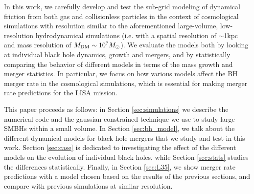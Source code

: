 In this work, we carefully develop and test the sub-grid modeling of dynamical friction from both gas and collisionless particles in the context of cosmological simulations with resolution similar to the aforementioned large-volume, low-resolution hydrodynamical simulations (i.e. with a spatial resolution of $\sim$1kpc and mass resolution of $M_{\rm DM}\sim 10^7M_\odot$). We evaluate the models both by looking at individual black hole dynamics, growth and mergers, and by statistically comparing the behavior of different models in terms of the mass growth and merger statistics. In particular, we focus on how various models affect the BH merger rate in the cosmological simulations, which is essential for making merger rate predictions for the LISA mission.
    
This paper proceeds as follows: in Section \ref{sec:simulations} we describe the numerical code and the gaussian-constrained technique we use to study large SMBHs within a small volume. In Section \ref{sec:bh_model}, we talk about the different dynamical models for black hole mergers that we study and test in this work. Section \ref{sec:case} is dedicated to investigating the effect of the different models on the evolution of individual black holes, while Section \ref{sec:stats} studies the differences statistically. Finally, in Section \ref{sec:L35}, we show merger rate predictions with a model chosen based on the results of the previous sections, and compare with previous simulations at similar resolution.
